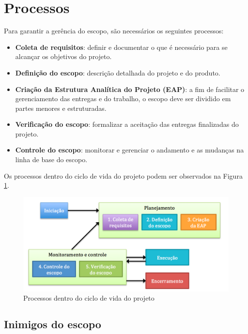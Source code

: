 \section{Processos}

Para garantir a gerência do escopo, são necessários os seguintes processos:

\begin{itemize}

\item \textbf{Coleta de requisitos}: definir e documentar o que é necessário para se alcançar os objetivos do projeto.

\item \textbf{Definição do escopo}: descrição detalhada do projeto e do produto.

\item \textbf{Criação da Estrutura Analítica do Projeto (EAP)}: a fim de facilitar o gerenciamento das entregas e do trabalho, o escopo deve ser dividido em partes menores e estruturadas.

\item \textbf{Verificação do escopo}: formalizar a aceitação das entregas finalizadas do projeto.

\item \textbf{Controle do escopo}: monitorar e gerenciar o andamento e as mudanças na linha de base do escopo.

\end{itemize}

Os processos dentro do ciclo de vida do projeto podem ser observados na Figura \ref{fig:ciclo:vida}.

\begin{figure}[!h]
\centering
\includegraphics[scale=0.5]{Figuras/ciclo_vida.png}
\caption{Processos dentro do ciclo de vida do projeto}
\label{fig:ciclo:vida}
\end{figure}

\subsection{Inimigos do escopo}

